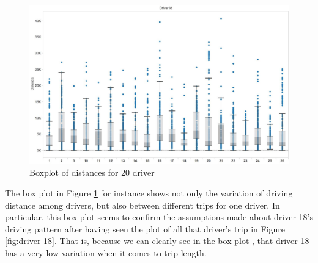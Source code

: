 \documentclass{vldb}
\begin{document}
\begin{figure}
\centering
\includegraphics[width=\linewidth]{"pics/box-plot-distance"}%
\caption{Boxplot of distances for 20 driver}
\label{fig:box-plot-distance}
\end{figure}
The box plot in Figure \ref{fig:box-plot-distance} for instance shows not only the variation of driving distance among drivers, but also between different trips for one driver.  In particular, this box plot seems to confirm the assumptions made about driver 18's driving pattern after having seen the plot of all that driver's trip in Figure \ref{fig:driver-18}. That is, because we can clearly see in the box plot , that driver 18 has a very low variation when it comes to trip length. 

\end{document}
